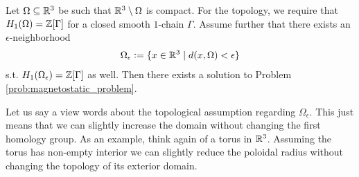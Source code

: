 \documentclass[../master_thesis.tex]{subfiles}
\begin{document}
\begin{theorem}\label{thm:existence}
    Let $\Omega \subseteq \mathbb{R}^3$ be such that $\mathbb{R}^3 \setminus \Omega$
    is compact. 
    For the topology, we require that $H_1(\Omega) = \mathbb{Z} [\Gamma]$ 
    for a closed smooth $1$-chain 
    $\Gamma$. Assume further that there exists an $\epsilon$-neighborhood 
    \begin{align*}
        \Omega_\epsilon \vcentcolon= \{ x \in \mathbb{R}^3 \mid
            d(x,\Omega) < \epsilon \} 
    \end{align*}
    s.t. $H_1(\Omega_\epsilon) = \mathbb{Z} [\Gamma]$ as well.
    Then there exists a solution 
    to Problem \ref{prob:magnetostatic_problem}.
\end{theorem}
Let us say a view words about the topological assumption 
regarding $\Omega_\epsilon$. This just means that we can slightly increase 
the domain without changing the first homology group. As an example, 
think again of a torus in $\mathbb{R}^3$. Assuming the torus has non-empty interior 
we can slightly reduce the poloidal radius without changing the topology of its 
 exterior domain.
\end{document}
